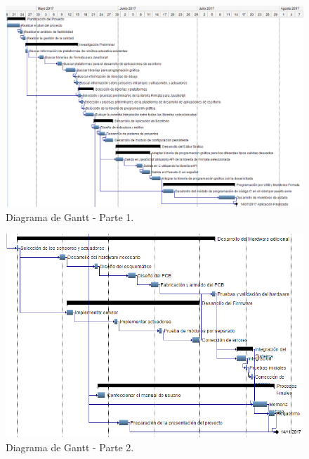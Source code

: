 \begin{figure}[h]
\centering
\includegraphics[scale=.5]{./Figures/gantt-1.jpg}
\caption{Diagrama de Gantt - Parte 1.}
\label{fig:gantt-1}
\end{figure}

\begin{figure}[h]
\centering
\includegraphics[scale=.7]{./Figures/gantt-2.jpg}
\caption{Diagrama de Gantt - Parte 2.}
\label{fig:gantt-2}
\end{figure}